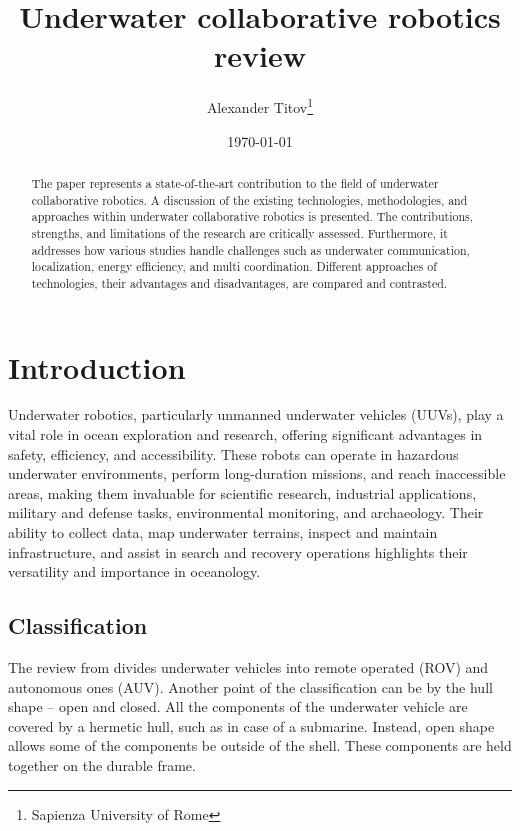 \documentclass[a4paper]{article}
\title{Underwater collaborative robotics review}
\author{Alexander Titov\thanks{Sapienza University of Rome} 
	}
\date{\today}
\begin{document}
	
	\maketitle
	
\begin{abstract}
The paper represents a state-of-the-art contribution to the field of underwater collaborative robotics. A discussion of the existing technologies, methodologies, and approaches within underwater collaborative robotics is presented. The contributions, strengths, and limitations of the research are critically assessed. Furthermore, it addresses how various studies handle challenges such as underwater communication, localization, energy efficiency, and multi coordination. Different approaches of technologies, their advantages and disadvantages, are compared and contrasted.
\end{abstract}
	
\section{Introduction}
Underwater robotics, particularly unmanned underwater vehicles (UUVs), play a vital role in ocean exploration and research, offering significant advantages in safety, efficiency, and accessibility. These robots can operate in hazardous underwater environments, perform long-duration missions, and reach inaccessible areas, making them invaluable for scientific research, industrial applications, military and defense tasks, environmental monitoring, and archaeology. Their ability to collect data, map underwater terrains, inspect and maintain infrastructure, and assist in search and recovery operations highlights their versatility and importance in oceanology. 
\subsection{Classification}
The review from \cite{neira_review_2021} divides underwater vehicles into remote operated (ROV) and autonomous ones (AUV). Another point of the classification can be  by the hull shape -- open and closed. All the components of the underwater vehicle are covered by a hermetic hull, such as in case of a submarine. Instead, open shape allows some of the components be outside of the shell. These components are held together on the durable frame.
\end{document}
